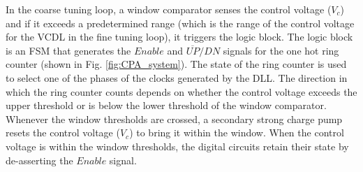 \documentclass[journal,twoside,letterpaper]{IEEEtran}
\begin{document}
In the coarse tuning loop,
a window comparator senses the control voltage ($V_c$)
and if it exceeds a predetermined range
(which is the range of the control voltage for the VCDL
in the fine tuning loop), it triggers the logic block.
The logic block is an FSM that
generates the $Enable$ and $\overline{UP}/DN$ signals
for the one hot ring counter (shown 
in Fig. \ref{fig:CPA_system}).
The state of the ring counter is used
to select one of the phases of the clocks generated by the DLL.
The direction in which the ring counter counts
depends on whether the control voltage exceeds the upper threshold
or is below the lower threshold of the window comparator.
Whenever the window thresholds are crossed,
a secondary strong charge pump resets the control voltage ($V_c$)
to bring it within the window.
When the control voltage is within the window thresholds,
the digital circuits retain their state by de-asserting the
$Enable$ signal.
\end{document}
